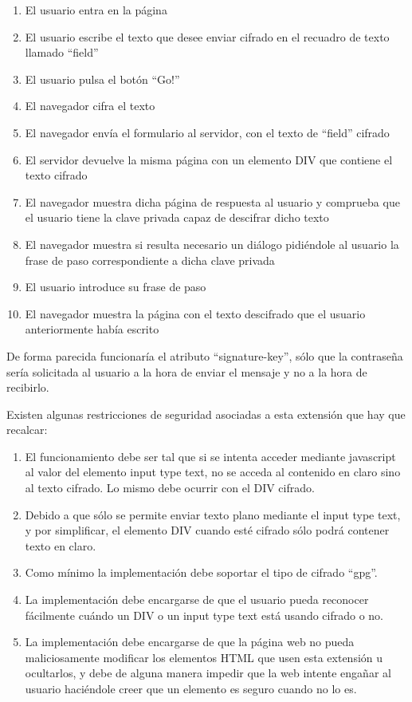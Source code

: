 \begin{enumerate}
 \item El usuario entra en la página
 \item El usuario escribe el texto que desee enviar cifrado en el recuadro de texto llamado ``field''
 \item El usuario pulsa el botón ``Go!''
 \item El navegador cifra el texto
 \item El navegador envía el formulario al servidor, con el texto de ``field'' cifrado
 \item El servidor devuelve la misma página con un elemento DIV que contiene el texto cifrado
 \item El navegador muestra dicha página de respuesta al usuario y comprueba que el usuario tiene la clave privada capaz de descifrar dicho texto
 \item El navegador muestra si resulta necesario un diálogo pidiéndole al usuario la frase de paso correspondiente a dicha clave privada
 \item El usuario introduce su frase de paso
 \item El navegador muestra la página con el texto descifrado que el usuario anteriormente había escrito
\end{enumerate}

De forma parecida funcionaría el atributo ``signature-key'', sólo que la contraseña sería solicitada al usuario a la hora de enviar el mensaje y no a la hora de recibirlo.

Existen algunas restricciones de seguridad asociadas a esta extensión que hay que recalcar: 
\begin{enumerate}
 \item El funcionamiento debe ser tal que si se intenta acceder mediante javascript al valor del elemento input type text, no se acceda al contenido en claro sino al texto cifrado. Lo mismo debe ocurrir con el DIV cifrado.
 \item Debido a que sólo se permite enviar texto plano mediante el input type text, y por simplificar, el elemento DIV cuando esté cifrado sólo podrá contener texto en claro.
 \item Como mínimo la implementación debe soportar el tipo de cifrado ``gpg''.
 \item La implementación debe encargarse de que el usuario pueda reconocer fácilmente cuándo un DIV o un input type text está usando cifrado o no.
 \item La implementación debe encargarse de que la página web no pueda maliciosamente modificar los elementos HTML que usen esta extensión u ocultarlos, y debe de alguna manera impedir que la web intente engañar al usuario haciéndole creer que un elemento es seguro cuando no lo es.
\end{enumerate}

